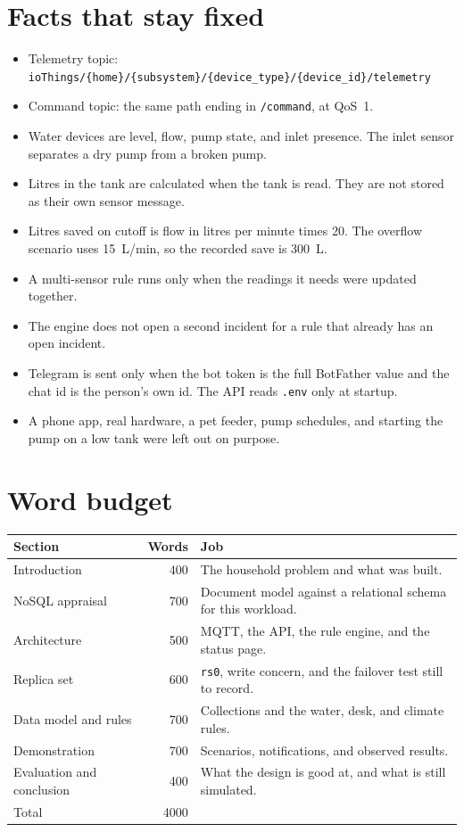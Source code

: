 \documentclass[11pt,a4paper]{article}
\begin{document}
\section{Facts that stay fixed}

\begin{itemize}
\item Telemetry topic:\\
\texttt{ioThings/\{home\}/\{subsystem\}/\{device\_type\}/\{device\_id\}/telemetry}
\item Command topic: the same path ending in \texttt{/command}, at QoS~1.
\item Water devices are level, flow, pump state, and inlet presence. The inlet sensor separates a dry pump from a broken pump.
\item Litres in the tank are calculated when the tank is read. They are not stored as their own sensor message.
\item Litres saved on cutoff is flow in litres per minute times 20. The overflow scenario uses 15~L/min, so the recorded save is 300~L.
\item A multi-sensor rule runs only when the readings it needs were updated together.
\item The engine does not open a second incident for a rule that already has an open incident.
\item Telegram is sent only when the bot token is the full BotFather value and the chat id is the person's own id. The API reads \texttt{.env} only at startup.
\item A phone app, real hardware, a pet feeder, pump schedules, and starting the pump on a low tank were left out on purpose.
\end{itemize}

\section{Word budget}

\begin{center}
\begin{tabular}{@{}lrp{8.4cm}@{}}
\toprule
Section & Words & Job \\
\midrule
Introduction & 400 & The household problem and what was built. \\
NoSQL appraisal & 700 & Document model against a relational schema for this workload. \\
Architecture & 500 & MQTT, the API, the rule engine, and the status page. \\
Replica set & 600 & \texttt{rs0}, write concern, and the failover test still to record. \\
Data model and rules & 700 & Collections and the water, desk, and climate rules. \\
Demonstration & 700 & Scenarios, notifications, and observed results. \\
Evaluation and conclusion & 400 & What the design is good at, and what is still simulated. \\
\midrule
Total & 4000 & \\
\bottomrule
\end{tabular}
\end{center}
\end{document}
